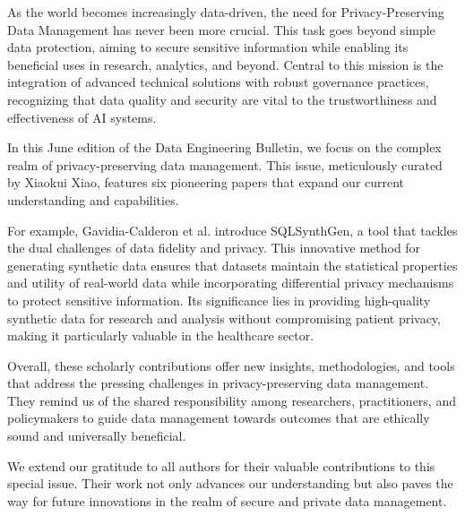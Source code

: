 \documentclass[11pt]{article}
\begin{document}
As the world becomes increasingly data-driven, the need for Privacy-Preserving Data Management has never been more crucial. This task goes beyond simple data protection, aiming to secure sensitive information while enabling its beneficial uses in research, analytics, and beyond. Central to this mission is the integration of advanced technical solutions with robust governance practices, recognizing that data quality and security are vital to the trustworthiness and effectiveness of AI systems.

In this June edition of the Data Engineering Bulletin, we focus on the complex realm of privacy-preserving data management. This issue, meticulously curated by Xiaokui Xiao, features six pioneering papers that expand our current understanding and capabilities. 

For example, Gavidia-Calderon et al. introduce SQLSynthGen, a tool that tackles the dual challenges of data fidelity and privacy. This innovative method for generating synthetic data ensures that datasets maintain the statistical properties and utility of real-world data while incorporating differential privacy mechanisms to protect sensitive information. Its significance lies in providing high-quality synthetic data for research and analysis without compromising patient privacy, making it particularly valuable in the healthcare sector.

Overall, these scholarly contributions offer new insights, methodologies, and tools that address the pressing challenges in privacy-preserving data management. They remind us of the shared responsibility among researchers, practitioners, and policymakers to guide data management towards outcomes that are ethically sound and universally beneficial.

We extend our gratitude to all authors for their valuable contributions to this special issue. Their work not only advances our understanding but also paves the way for future innovations in the realm of secure and private data management.
\end{document}
